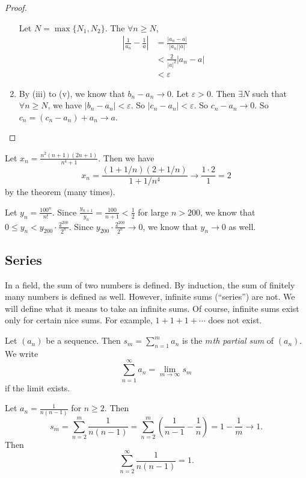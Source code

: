 \documentclass[a4paper]{article}
\begin{document}
\begin{proof}
\begin{enumerate}
      Let $N = \max\{N_1, N_2\}$. The $\forall n \geq N$,
      \begin{align*}
        \left|\frac{1}{a_n} - \frac{1}{a}\right| &= \frac{|a_n - a|}{|a_n||a|}\\
        &< \frac{2}{|a|^2}|a_n - a|\\
        &< \varepsilon
      \end{align*}
    \item By (iii) to (v), we know that $b_n - a_n \to 0$. Let $\varepsilon > 0$. Then $\exists N$ such that $\forall n\geq N$, we have $|b_n - a_n| < \varepsilon$. So $|c_n - a_n| < \varepsilon$. So $c_n - a_n \to 0$. So $c_n = (c_n - a_n) + a_n \to a$.
  \end{enumerate}
\end{proof}

\begin{eg}
  Let $x_n = \frac{n^2(n + 1)(2n + 1)}{n^4 + 1}$. Then we have
  \[
    x_n = \frac{(1 + 1/n)(2 + 1/n)}{1 + 1/n^4}\to \frac{1\cdot 2}{1} = 2
  \]
  by the theorem (many times).
\end{eg}

\begin{eg}
  Let $y_n = \frac{100^n}{n!}$. Since $\frac{y_{n + 1}}{y_n} = \frac{100}{n + 1} < \frac{1}{2}$ for large $n > 200$, we know that $0 \leq y_n < y_{200}\cdot \frac{2^{200}}{2^n}$. Since $y_{200}\cdot \frac{2^{200}}{2^n} \to 0$, we know that $y_n\to 0$ as well.
\end{eg}

\subsection{Series}
In a field, the sum of two numbers is defined. By induction, the sum of finitely many numbers is defined as well. However, infinite sums (``series'') are not. We will define what it means to take an infinite sums. Of course, infinite sums exist only for certain nice sums. For example, $1 + 1 + 1 + \cdots$ does not exist.

\begin{defi}
  Let $(a_n)$ be a sequence. Then $s_m = \sum_{n = 1}^m a_n$ is the \emph{$m$th partial sum} of $(a_n)$. We write
  \[
    \sum_{n = 1}^\infty a_n = \lim_{m\to \infty} s_m
  \]
  if the limit exists.
\end{defi}

\begin{eg}
  Let $a_n = \frac{1}{n(n - 1)}$ for $n\geq 2$. Then
  \[
    s_m = \sum_{n = 2}^m \frac{1}{n(n - 1)} = \sum_{n = 2}^m\left(\frac{1}{n - 1} - \frac{1}{n}\right) = 1 - \frac{1}{m}\to 1.
  \]
  Then
  \[
    \sum_{n = 2}^\infty \frac{1}{n(n - 1)} = 1.
  \]
\end{eg}
\end{document}
